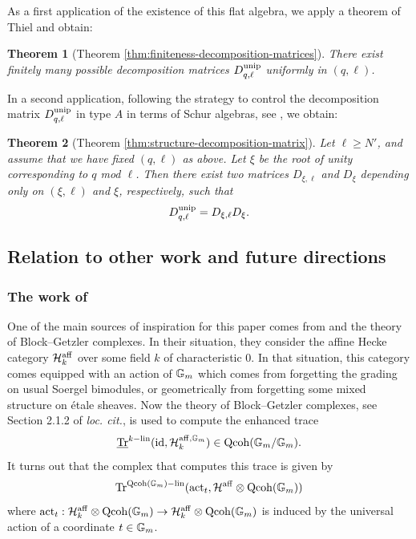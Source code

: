 \documentclass[a4paper, 10pt, oneside, reqno]{amsart}
\theoremstyle{plain}
\newtheorem{thm}{Theorem}[subsection]
\theoremstyle{definition}
\theoremstyle{remark}
\newcommand{\Qcoh}{\mathrm{Qcoh}}
\newcommand{\act}{\mathrm{act}}
\begin{document}
As a first application of the existence of this flat algebra, we apply a theorem of Thiel \cite{ThielDecompMatrices} and obtain:

\begin{thm}[Theorem \ref{thm:finiteness-decomposition-matrices}]
There exist finitely many possible decomposition matrices $D_{q,\ell}^{\mathrm{unip}}$ uniformly in $(q,\ell)$.
\end{thm}

In a second application, following the strategy to control the decomposition matrix $D_{q,\ell}^{\mathrm{unip}}$ in type $A$ in terms of Schur algebras, see \cite{GeckHeckeAlgRootOfUnity}, we obtain:

\begin{thm}[Theorem \ref{thm:structure-decomposition-matrix}]
Let $\ell \geq N'$, and assume that we have fixed $(q,\ell)$ as above. Let $\xi$ be the root of unity corresponding to $q$ mod $\ell$. Then there exist two matrices $D_{\xi, \ell}$ and $D_{\xi}$ depending only on $(\xi, \ell)$ and $\xi$, respectively, such that 
$$D^{\mathrm{unip}}_{q,\ell} = D_{\xi,\ell}D_{\xi}.$$
\end{thm}

\subsection{Relation to other work and future directions}

\subsubsection{The work of \cite{BZCHN}}
One of the main sources of inspiration for this paper comes from \cite{BZCHN} and the theory of Block--Getzler complexes. In their situation, they consider the affine Hecke category $\mathcal{H}^{\mathrm{aff}}_k$ over some field $k$ of characteristic $0$. In that situation, this category comes equipped with an action of $\mathbb{G}_m$ which comes from forgetting the grading on usual Soergel bimodules, or geometrically from forgetting some mixed structure on étale sheaves. Now the theory of Block--Getzler complexes, see Section 2.1.2 of \emph{loc. cit.}, is used to compute the enhanced trace 
$$\underline{\Tr}^{k-\mathrm{lin}}(\id, \Hcal^{\aff, \Gm}_k) \in \Qcoh(\Gm/\Gm).$$ 
It turns out that the complex that computes this trace is given by 
$$\Tr^{\Qcoh(\Gm)-\mathrm{lin}}(\act_t, \Hcal^{\aff} \otimes \Qcoh(\Gm))$$
where $\act_t : \Hcal^{\aff}_k \otimes \Qcoh(\Gm) \to \Hcal^{\aff}_k \otimes \Qcoh(\Gm)$ is induced by the universal action of a coordinate $t \in \mathbb{G}_m$. 
\end{document}
